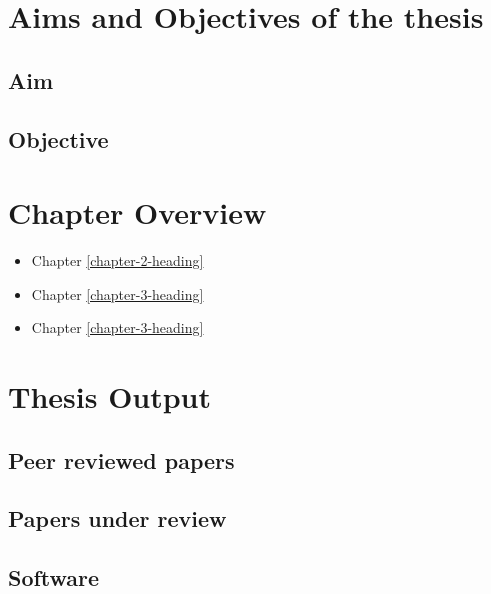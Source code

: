 \documentclass[a4paper, nobind]{templates/ociamthesis}
\providecommand{\tightlist}{%
  \setlength{\itemsep}{0pt}\setlength{\parskip}{0pt}}
\begin{document}
\minitoc 

\hypertarget{aims-and-objectives-of-the-thesis}{%
\section{Aims and Objectives of the thesis}\label{aims-and-objectives-of-the-thesis}}

\hypertarget{aim}{%
\subsection{Aim}\label{aim}}

\hypertarget{objective}{%
\subsection{Objective}\label{objective}}

\hypertarget{chapter-overview}{%
\section{Chapter Overview}\label{chapter-overview}}

\begin{itemize}
\tightlist
\item
  Chapter \ref{chapter-2-heading}
\item
  Chapter \ref{chapter-3-heading}
\item
  Chapter \ref{chapter-3-heading}
\end{itemize}

\hypertarget{thesis-output}{%
\section{Thesis Output}\label{thesis-output}}

\hypertarget{peer-reviewed-papers}{%
\subsection{Peer reviewed papers}\label{peer-reviewed-papers}}

\hypertarget{papers-under-review}{%
\subsection{Papers under review}\label{papers-under-review}}

\hypertarget{software}{%
\subsection{Software}\label{software}}
\end{document}
